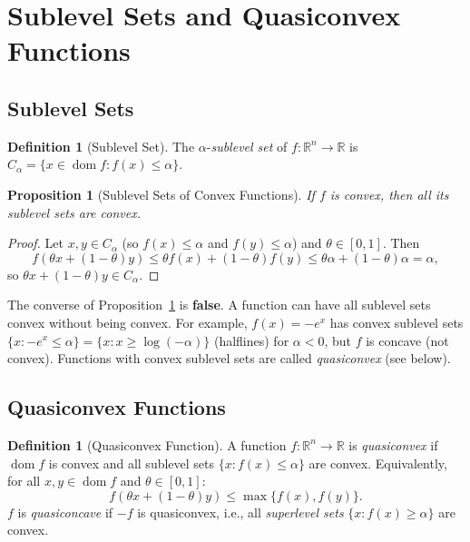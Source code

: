 \documentclass[11pt,a4paper]{article}
\newtheorem{proposition}[theorem]{Proposition}
\theoremstyle{definition}
\newtheorem{definition}[theorem]{Definition}
\theoremstyle{remark}
\newcommand{\R}{\mathbb{R}}
\DeclareMathOperator{\dom}{dom}
\begin{document}
\section{Sublevel Sets and Quasiconvex Functions}

\subsection{Sublevel Sets}

\begin{definition}[Sublevel Set]
\label{def:sublevel}
The $\alpha$-\emph{sublevel set} of $f : \R^n \to \R$ is
$C_\alpha = \{x \in \dom f : f(x) \le \alpha\}$.
\end{definition}

\begin{proposition}[Sublevel Sets of Convex Functions]
\label{prop:sublevel}
If $f$ is convex, then all its sublevel sets are convex.
\end{proposition}

\begin{proof}
Let $x, y \in C_\alpha$ (so $f(x) \le \alpha$ and $f(y) \le \alpha$) and
$\theta \in [0,1]$. Then
\[
  f(\theta x + (1-\theta) y) \le \theta f(x) + (1-\theta) f(y)
  \le \theta \alpha + (1-\theta) \alpha = \alpha,
\]
so $\theta x + (1-\theta) y \in C_\alpha$.
\end{proof}

\begin{warning}
The converse of Proposition~\ref{prop:sublevel} is \textbf{false}. A function can have
all sublevel sets convex without being convex. For example, $f(x) = -e^x$ has convex
sublevel sets $\{x : -e^x \le \alpha\} = \{x : x \ge \log(-\alpha)\}$ (halflines)
for $\alpha < 0$, but $f$ is concave (not convex). Functions with convex sublevel sets
are called \emph{quasiconvex} (see below).
\end{warning}

\subsection{Quasiconvex Functions}

\begin{definition}[Quasiconvex Function]
\label{def:quasiconvex}
A function $f : \R^n \to \R$ is \emph{quasiconvex} if $\dom f$ is convex and all
sublevel sets $\{x : f(x) \le \alpha\}$ are convex. Equivalently, for all
$x, y \in \dom f$ and $\theta \in [0,1]$:
\[
  f(\theta x + (1-\theta) y) \le \max\{f(x), f(y)\}.
\]
$f$ is \emph{quasiconcave} if $-f$ is quasiconvex, i.e., all \emph{superlevel sets}
$\{x : f(x) \ge \alpha\}$ are convex.
\end{definition}
\end{document}
